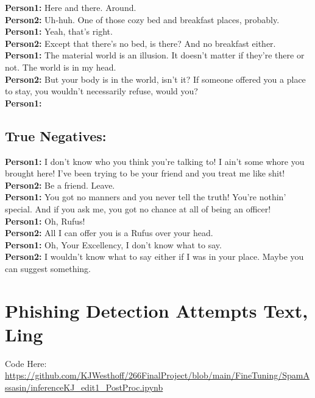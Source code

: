 \documentclass[
	letterpaper, %
	12pt, %
	unnumberedsections, %
	twoside, %
]{LTJournalArticle}
\begin{document}
\begin{appendices}
{		\noindent\textbf{Person1:}  Here and there. Around. \\
		\noindent\textbf{Person2:}  Uh-huh. One of those cozy bed and breakfast places, probably. \\
		\noindent\textbf{Person1:}  Yeah, that's right. \\
		\noindent\textbf{Person2:}  Except that there's no bed, is there? And no breakfast either. \\
		\noindent\textbf{Person1:}  The material world is an illusion. It doesn't matter if they're there or not. The world is in my head. \\
		\noindent\textbf{Person2:}  But your body is in the world, isn't it?  If someone offered you a place to stay, you wouldn't necessarily refuse, would you? \\
		\noindent\textbf{Person1:}  \\


	}

	\subsection{True Negatives:}
	{\ttfamily \tiny
		\noindent\textbf{Person1:}  I don't know who you think you're talking to! I ain't some whore you brought here! I've been trying to be your friend and you treat me like shit! \\
		\noindent\textbf{Person2:}  Be a friend. Leave. \\
		\noindent\textbf{Person1:}  You got no manners and you never tell the truth! You're nothin' special. And if you ask me, you got no chance at all of being an officer! \\

		\noindent\textbf{Person1:}  Oh, Rufus! \\
		\noindent\textbf{Person2:}  All I can offer you is a Rufus over your head. \\
		\noindent\textbf{Person1:}  Oh, Your Excellency, I don't know what to say. \\
		\noindent\textbf{Person2:}  I wouldn't know what to say either if I was in your place.  Maybe you can suggest something. \\


	}

	\section{Phishing Detection Attempts Text, Ling}\label{appendix:ling}
	Code Here: \\
	\url{https://github.com/KJWesthoff/266FinalProject/blob/main/FineTuning/SpamAssasin/inferenceKJ_edit1_PostProc.ipynb}

\end{appendices}
\end{document}
